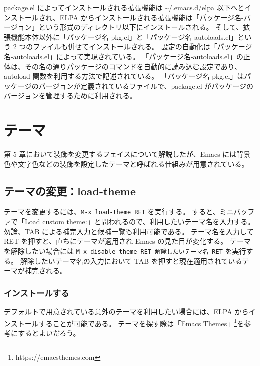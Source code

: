 package.el によってインストールされる拡張機能は \textasciitilde{}/.emacs.d/elpa 以下へとインストールされ、ELPA からインストールされる拡張機能は「パッケージ名-バージョン」という形式のディレクトリ以下にインストールされる。
そして、拡張機能本体以外に「パッケージ名-pkg.el」と「パッケージ名-autoloads.el」という 2 つのファイルも併せてインストールされる。
設定の自動化は「パッケージ名-autoloads.el」によって実現されている。
「パッケージ名-autoloads.el」の正体は、その名の通りパッケージのコマンドを自動的に読み込む設定であり、autoload 関数を利用する方法で記述されている。
「パッケージ名-pkg.el」はパッケージのバージョンが定義されているファイルで、package.el がパッケージのバージョンを管理するために利用される。
\section{テーマ}
第 5 章において装飾を変更するフェイスについて解説したが、Emacs には背景色や文字色などの装飾を設定したテーマと呼ばれる仕組みが用意されている。
\subsection{テーマの変更：load-theme}
テーマを変更するには、\texttt{M-x load-theme RET} を実行する。
すると、ミニバッファで「Load custom theme:」と問われるので、利用したいテーマ名を入力する。
勿論、TAB による補完入力と候補一覧も利用可能である。
テーマ名を入力して RET を押すと、直ちにテーマが適用され Emacs の見た目が変化する。
テーマを解除したい場合には \texttt{M-x disable-theme RET 解除したいテーマ名 RET} を実行する。
解除したいテーマ名の入力において TAB を押すと現在適用されているテーマが補完される。
\subsubsection{インストールする}
デフォルトで用意されている意外のテーマを利用したい場合には、ELPA からインストールすることが可能である。
テーマを探す際は「Emacs Themes」\footnote{https://emacsthemes.com}を参考にするとよいだろう。\\

